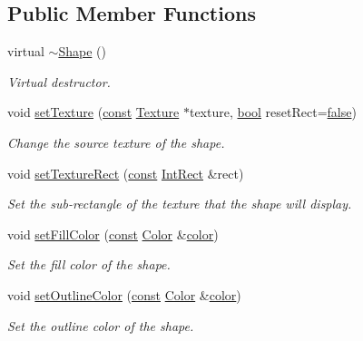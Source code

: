 \subsection*{Public Member Functions}
\begin{DoxyCompactItemize}
\item 
virtual \hyperlink{classsf_1_1_shape_a2262aceb9df52d4275c19633592f19bf}{$\sim$\-Shape} ()
\begin{DoxyCompactList}\small\item\em Virtual destructor. \end{DoxyCompactList}\item 
void \hyperlink{classsf_1_1_shape_af8fb22bab1956325be5d62282711e3b6}{set\-Texture} (\hyperlink{term__entry_8h_a57bd63ce7f9a353488880e3de6692d5a}{const} \hyperlink{classsf_1_1_texture}{Texture} $\ast$texture, \hyperlink{term__entry_8h_a002004ba5d663f149f6c38064926abac}{bool} reset\-Rect=\hyperlink{_snake_8cpp_ae6c865df784842196d411c1466b01686}{false})
\begin{DoxyCompactList}\small\item\em Change the source texture of the shape. \end{DoxyCompactList}\item 
void \hyperlink{classsf_1_1_shape_a2029cc820d1740d14ac794b82525e157}{set\-Texture\-Rect} (\hyperlink{term__entry_8h_a57bd63ce7f9a353488880e3de6692d5a}{const} \hyperlink{namespacesf_a1b1279ab06950b96686cffaacb72fed5}{Int\-Rect} \&rect)
\begin{DoxyCompactList}\small\item\em Set the sub-\/rectangle of the texture that the shape will display. \end{DoxyCompactList}\item 
void \hyperlink{classsf_1_1_shape_a3506f9b5d916fec14d583d16f23c2485}{set\-Fill\-Color} (\hyperlink{term__entry_8h_a57bd63ce7f9a353488880e3de6692d5a}{const} \hyperlink{classsf_1_1_color}{Color} \&\hyperlink{_entity_8cpp_a864889304a90873adb9c6e289a54bcf4}{color})
\begin{DoxyCompactList}\small\item\em Set the fill color of the shape. \end{DoxyCompactList}\item 
void \hyperlink{classsf_1_1_shape_a5978f41ee349ac3c52942996dcb184f7}{set\-Outline\-Color} (\hyperlink{term__entry_8h_a57bd63ce7f9a353488880e3de6692d5a}{const} \hyperlink{classsf_1_1_color}{Color} \&\hyperlink{_entity_8cpp_a864889304a90873adb9c6e289a54bcf4}{color})
\begin{DoxyCompactList}\small\item\em Set the outline color of the shape. \end{DoxyCompactList}\item 

\end{DoxyCompactItemize}

